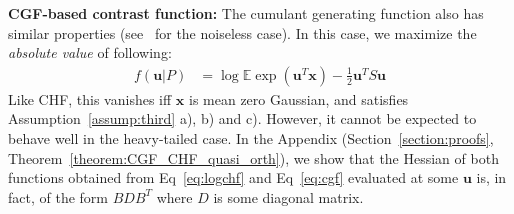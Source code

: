 \documentclass[letterpaper]{article}
\newtheorem{theorem}{Theorem}
\newcommand{\ba}[1]{\begin{align}#1\end{align}}
\newcommand{\bu}{\pmb{u}}
\newcommand{\bx}{\pmb{x}}
\newcommand{\be}{\pmb{e}}
\newcommand{\bz}{\pmb{z}}
\newcommand{\bvar}{\pmb{a}}
\newcommand{\E}{\mathbb{E}}
\newcommand{\bbb}[1]{\left[#1\right]}
\DeclareMathOperator{\diag}{diag}
\begin{document}
\textbf{CGF-based contrast function:} The cumulant generating function also has similar properties (see~\cite{YEREDOR2000897} for the noiseless case). In this case, we maximize the \textit{absolute value} of following:
\ba{
f(\bu|P) &= \log \E\exp(\bu^T\bx) - \frac{1}{2}\bu^TS\bu \label{eq:cgf}
}
Like CHF, this vanishes iff $\bx$ is mean zero Gaussian, and satisfies Assumption~\ref{assump:third} a), b) and c). However, it cannot be expected to behave well in the heavy-tailed case. In the Appendix (Section~\ref{section:proofs},  Theorem~\ref{theorem:CGF_CHF_quasi_orth}), we show that the Hessian of both functions obtained from Eq~\ref{eq:logchf} and Eq~\ref{eq:cgf} evaluated at some $\bu$ is, in fact, of the form $BDB^T$ where $D$ is some diagonal matrix. 

\end{document}
